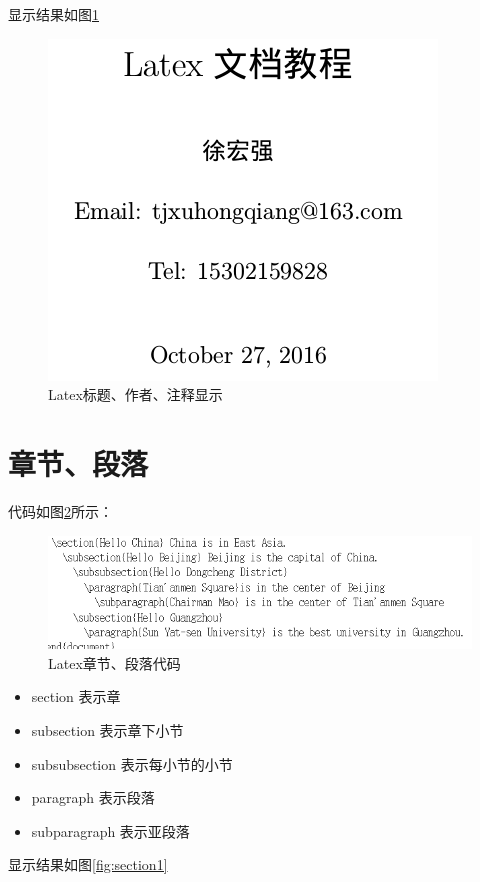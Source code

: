 \documentclass[a4paper,  11pt]{article}
\begin{document}
显示结果如图\ref{fig:user1}

\begin{figure}[h!]
\centering
\includegraphics[scale=.3]{author2.png}
\caption{Latex标题、作者、注释显示}
\label{fig:user1}
\end{figure}


\section{章节、段落}
代码如图\ref{fig:section}所示：

\begin{figure}[h!]
\centering
\includegraphics[scale=.5]{section.png}
\caption{Latex章节、段落代码}
\label{fig:section}
\end{figure}

\begin{itemize}
  \item section 表示章
  \item subsection 表示章下小节
  \item subsubsection 表示每小节的小节
  \item paragraph 表示段落
  \item subparagraph 表示亚段落
\end{itemize}


显示结果如图\ref{fig:section1}
\end{document}
